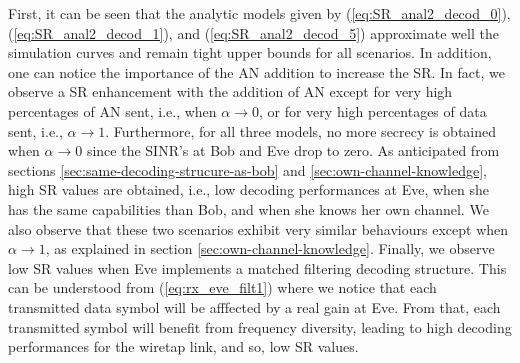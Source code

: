 \documentclass[journal,comsoc]{IEEEtran}
\begin{document}
First, it can be seen that the analytic models given by (\ref{eq:SR_anal2_decod_0}), (\ref{eq:SR_anal2_decod_1}), and (\ref{eq:SR_anal2_decod_5}) approximate well the simulation curves and remain tight upper bounds for all scenarios.  In addition, one can notice the importance of the AN addition to increase the SR. In fact, we observe a SR enhancement with the addition of AN except for very high percentages of AN sent, i.e., when $\alpha \to 0$, or for very high percentages of data sent, i.e., $\alpha \to 1$. Furthermore, for all three models, no more secrecy is obtained when $\alpha \to 0$ since the SINR's at Bob and Eve drop to zero. As anticipated from sections \ref{sec:same-decoding-strucure-as-bob} and \ref{sec:own-channel-knowledge}, high SR values are obtained, i.e., low decoding performances at Eve, when she has the same capabilities than Bob, and when she knows her own channel. We also observe that these two scenarios exhibit very similar behaviours except when $\alpha \to 1$, as explained in section \ref{sec:own-channel-knowledge}. Finally, we observe low SR values when Eve implements a matched filtering decoding structure. This can be understood from (\ref{eq:rx_eve_filt1}) where we notice that each transmitted data symbol will be afffected by a real gain at Eve. From that, each transmitted symbol will benefit from frequency diversity, leading to high decoding performances for the wiretap link, and so, low SR values.   
\end{document}
